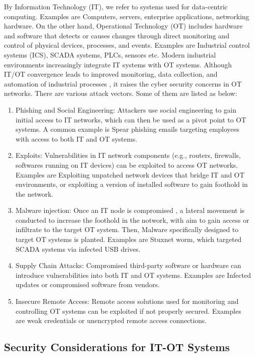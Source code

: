 By Information Technology (IT), we refer to systems used for data-centric computing. Examples are Computers, servers, enterprise applications, networking hardware. On the other hand, Operational Technology (OT) includes hardware and software that detects or causes changes through direct monitoring and control of physical devices, processes, and events. Examples are Industrial control systems (ICS), SCADA systems, PLCs, sensors etc.
Modern industrial environments increasingly integrate IT systems with OT systems. Although IT/OT convergence leads to improved monitoring, data collection, and automation of industrial processes , it raises the cyber security concerns in OT networks.
There are various attack vectors. Some of them are listed as below: 
\begin{enumerate}
    \item Phishing and Social Engineering: Attackers use social engineering to gain initial access to IT networks, which can then be used as a pivot point to OT systems. A common example is Spear phishing emails targeting employees with access to both IT and OT systems.
    \item Exploits: Vulnerabilities in IT network components (e.g., routers, firewalls, softwares running on IT devices) can be exploited to access OT networks. Examples are Exploiting unpatched network devices that bridge IT and OT environments, or exploiting a version of installed software to gain foothold in the network.
    \item Malware injection: Once an IT node is compromised , a lateral movement is conducted to increase the foothold in the notwork, with aim to gain access or infiltrate  to the target OT system. Then, Malware specifically designed to target OT systems is planted. Examples are  Stuxnet worm, which targeted SCADA systems via infected USB drives.
    \item Supply Chain Attacks: Compromised third-party software or hardware can introduce vulnerabilities into both IT and OT systems. Examples are Infected updates or compromised software from vendors.
    \item Insecure Remote Access: Remote access solutions used for monitoring and controlling OT systems can be exploited if not properly secured. Examples are weak credentials or unencrypted remote access connections.
    
\end{enumerate}


\subsection{Security Considerations for IT-OT Systems}


